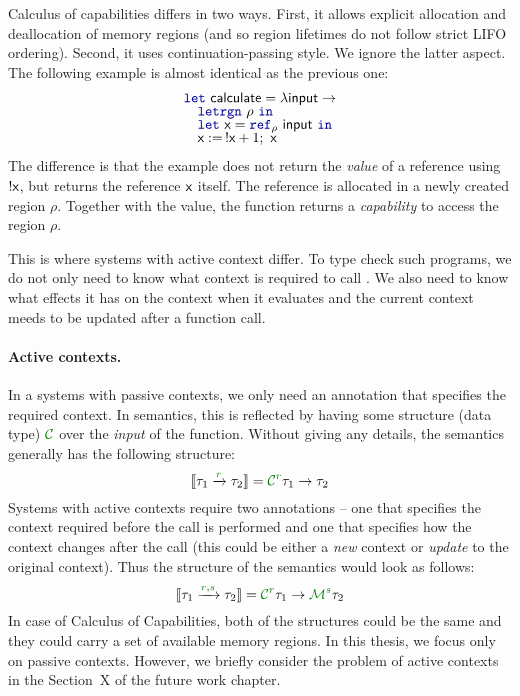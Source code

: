 Calculus of capabilities differs in two ways. First, it allows explicit allocation and deallocation
of memory regions (and so region lifetimes do not follow strict LIFO ordering). Second, it
uses continuation-passing style. We ignore the latter aspect. The following example is almost 
identical as the previous one:
%
\begin{equation*}
\begin{array}{l}
\kvd{let}~\ident{calculate} = \lambda \ident{input} \rightarrow\\[-0.25em]
\quad \kvd{letrgn}~\rho~\kvd{in}\\[-0.25em]
\quad \kvd{let}~\ident{x} = \kvd{ref}_\rho ~\ident{input}~\kvd{in}\\[-0.25em]
\quad \ident{x} :=\, !\ident{x} + 1;~ \ident{x}
\end{array}
\end{equation*}
%
The difference is that the example does not return the \emph{value} of a reference using 
$!\textnormal{\sffamily x}$, but returns the reference $\textnormal{\sffamily x}$ itself. The reference is allocated in a newly 
created region $\rho$. Together with the value, the function returns a \emph{capability} to access 
the region $\rho$.

This is where systems with active context differ. To type check such programs, we do not only need
to know what context is required to call . We also need to know what effects it
has on the context when it evaluates and the current context meeds to be updated after a function 
call. 

\paragraph{Active contexts.}
In a systems with passive contexts, we only need an annotation that specifies the required 
context. In semantics, this is reflected by having some structure (data type) $\C$ over the
\emph{input} of the function. Without giving any details, the semantics generally has the 
following structure:
%
\begin{equation*}
\sem{\tau_1 \xrightarrow{\cclrd{r}} \tau_2} = \C^{\cclrd{r}} \tau_1 \rightarrow \tau_2
\end{equation*}
%
Systems with active contexts require two annotations -- one that specifies the context required
before the call is performed and one that specifies how the context changes after the call (this
could be either a \emph{new} context or \emph{update} to the original context). Thus the structure
of the semantics would look as follows:
%
\begin{equation*}
\sem{\tau_1 \xrightarrow{\cclrd{r}, \cclrd{s}} \tau_2} = \C^{\cclrd{r}} \tau_1 \rightarrow \M^{\cclrd{s}} \tau_2
\end{equation*}
%
In case of Calculus of Capabilities, both of the structures could be the same and they could
carry a set of available memory regions. In this thesis, we focus only on passive contexts. 
However, we briefly consider the problem of active contexts in the Section~X of the future work 
chapter.

